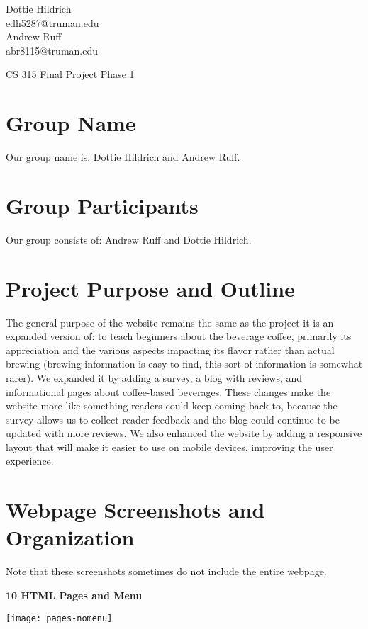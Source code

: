 \documentclass[12pt]{article}
\begin{document}
\begin{flushright}
Dottie Hildrich\\
edh5287@truman.edu\\
Andrew Ruff\\
abr8115@truman.edu
\end{flushright}


\begin{center}
	\huge{CS 315 Final Project Phase 1}
\end{center}

\pagebreak

\section{Group Name}
Our group name is: Dottie Hildrich and Andrew Ruff.

\section{Group Participants}
Our group consists of: Andrew Ruff and Dottie Hildrich.

\section{Project Purpose and Outline}
The general purpose of the website remains the same as the project it is an
expanded version of: to teach beginners about the beverage coffee,
primarily its appreciation and the various aspects impacting its
flavor rather than actual brewing (brewing information is easy to find, this
sort of information is somewhat rarer). We expanded it by adding a survey,
a blog with reviews, and informational pages about coffee-based beverages.
These changes make the website more like something readers could keep coming
back to, because the survey allows us to collect reader feedback and the blog
could continue to be updated with more reviews. We also enhanced the website
by adding a responsive layout that will make it easier to use on mobile devices,
improving the user experience.

\section{Webpage Screenshots and Organization}
Note that these screenshots sometimes do not include the entire webpage.

\textbf{10 HTML Pages and Menu}

\texttt{[image: pages-nomenu]}
\end{document}
